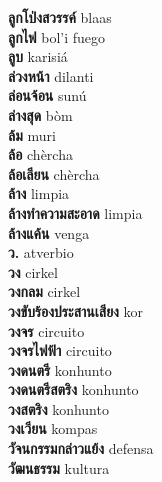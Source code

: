 \textbf{ ลูกโป่งสวรรค์  } blaas \\
\textbf{ ลูกไฟ  } bol’i fuego \\
\textbf{ ลูบ  } karisiá \\
\textbf{ ล่วงหน้า  } dilanti \\
\textbf{ ล่อนจ้อน  } sunú \\
\textbf{ ล่างสุด  } bòm \\
\textbf{ ล้ม  } muri \\
\textbf{ ล้อ  } chèrcha \\
\textbf{ ล้อเลียน  } chèrcha \\
\textbf{ ล้าง  } limpia \\
\textbf{ ล้างทำความสะอาด  } limpia \\
\textbf{ ล้างแค้น  } venga \\
\textbf{ ว.  } atverbio \\
\textbf{ วง  } cirkel \\
\textbf{ วงกลม  } cirkel \\
\textbf{ วงขับร้องประสานเสียง  } kor \\
\textbf{ วงจร  } circuito \\
\textbf{ วงจรไฟฟ้า  } circuito \\
\textbf{ วงดนตรี  } konhunto \\
\textbf{ วงดนตรีสตริง  } konhunto \\
\textbf{ วงสตริง  } konhunto \\
\textbf{ วงเวียน  } kompas \\
\textbf{ วัจนกรรมกล่าวแย้ง  } defensa \\
\textbf{ วัฒนธรรม  } kultura \\
